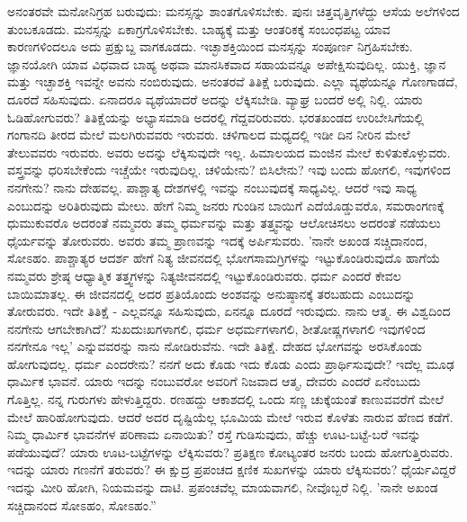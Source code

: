 ಅನಂತರವೇ ಮನೋನಿಗ್ರಹ ಬರುವುದು: ಮನಸ್ಸನ್ನು ಶಾಂತಗೊಳಿಸಬೇಕು. ಪುನಃ ಚಿತ್ತವೃತ್ತಿಗಳೆದ್ದು ಆಸೆಯ ಅಲೆಗಳಿಂದ ತುಂಬಕೂಡದು. ಮನಸ್ಸನ್ನು ಏಕಾಗ್ರಗೊಳಿಸಬೇಕು. ಬಾಹ್ಯಕ್ಕೆ ಮತ್ತು ಆಂತರಿಕಕ್ಕೆ ಸಂಬಂಧಪಟ್ಟ ಯಾವ ಕಾರಣಗಳಿಂದಲೂ ಅದು ಪ್ರಕ್ಷುಬ್ದ ವಾಗಕೂಡದು. ಇಚ್ಛಾಶಕ್ತಿಯಿಂದ ಮನಸ್ಸನ್ನು ಸಂಪೂರ್ಣ ನಿಗ್ರಹಿಸಬೇಕು. ಜ್ಞಾನಯೋಗಿ ಯಾವ ವಿಧವಾದ ಬಾಹ್ಯ ಅಥವಾ ಮಾನಸಿಕವಾದ ಸಹಾಯವನ್ನೂ ಅಪೇಕ್ಷಿಸುವುದಿಲ್ಲ. ಯುಕ್ತಿ, ಜ್ಞಾನ ಮತ್ತು ಇಚ್ಛಾಶಕ್ತಿ ಇವನ್ನೇ ಅವನು ನಂಬಿರುವುದು. ಅನಂತರವೆ ತಿತಿಕ್ಷೆ ಬರುವುದು. ಎಲ್ಲಾ ವ್ಯಥೆಯನ್ನೂ ಗೊಣಗಾಡದೆ, ದೂರದೆ ಸಹಿಸುವುದು. ಏನಾದರೂ ವ್ಯಥೆಯಾದರೆ ಅದನ್ನು ಲೆಕ್ಕಿಸಬೇಡಿ. ವ್ಯಾಘ್ರ ಬಂದರೆ ಅಲ್ಲಿ ನಿಲ್ಲಿ. ಯಾರು ಓಡಿಹೋಗುವರು? ತಿತಿಕ್ಷೆಯನ್ನು ಅಭ್ಯಾಸಮಾಡಿ ಅದರಲ್ಲಿ ಗೆದ್ದವರಿರುವರು. ಭರತಖಂಡದ ಉರಿಬೇಸಿಗೆಯಲ್ಲಿ ಗಂಗಾನದಿ ತೀರದ ಮೇಲೆ ಮಲಗಿರುವವರು ಇರುವರು. ಚಳಿಗಾಲದ ಮಧ್ಯದಲ್ಲಿ ಇಡೀ ದಿನ ನೀರಿನ ಮೇಲೆ ತೇಲುವವರು ಇರುವರು. ಅವರು ಅದನ್ನು ಲೆಕ್ಕಿಸುವುದೇ ಇಲ್ಲ. ಹಿಮಾಲಯದ ಮಂಜಿನ ಮೇಲೆ ಕುಳಿತುಕೊಳ್ಳುವರು. ವಸ್ತ್ರವನ್ನು ಧರಿಸಬೇಕೆಂದು ಇಚ್ಚೆಯೇ ಇರುವುದಿಲ್ಲ. ಚಳಿಯೇನು? ಬಿಸಿಲೇನು? ಇವು ಬಂದು ಹೋಗಲಿ, ಇವುಗಳಿಂದ ನನಗೇನು? ನಾನು ದೇಹವಲ್ಲ. ಪಾಶ್ಚಾತ್ಯ ದೇಶಗಳಲ್ಲಿ ಇವನ್ನು ನಂಬುವುದಕ್ಕೆ ಸಾಧ್ಯವಿಲ್ಲ. ಆದರೆ ಇವು ಸಾಧ್ಯ ಎಂಬುದನ್ನು ಅರಿತಿರುವುದು ಮೇಲು. ಹೇಗೆ ನಿಮ್ಮ ಜನರು ಗುಂಡಿನ ಬಾಯಿಗೆ ಎದೆಯೊಡ್ಡುವರೊ, ಸಮರಾಂಗಣಕ್ಕೆ ಧುಮುಕುವರೊ ಅದರಂತೆ ನಮ್ಮವರು ತಮ್ಮ ಧರ್ಮವನ್ನು ಮತ್ತು ತತ್ತ್ವವನ್ನು ಆಲೋಚಿಸಲು ಅದರಂತೆ ನಡೆಯಲು ಧೈರ್ಯವನ್ನು ತೋರುವರು. ಅವರು ತಮ್ಮ ಪ್ರಾಣವನ್ನು ಇದಕ್ಕೆ ಅರ್ಪಿಸುವರು. 'ನಾನೇ ಅಖಂಡ ಸಚ್ಚಿದಾನಂದ, ಸೋಽಹಂ. ಪಾಶ್ಚಾತ್ಯರ ಆದರ್ಶ ಹೇಗೆ ನಿತ್ಯ ಜೀವನದಲ್ಲಿ ಭೋಗಸಾಮಗ್ರಿಗಳನ್ನು ಇಟ್ಟುಕೊಂಡಿರುವುದೊ ಹಾಗೆಯೆ ನಮ್ಮವರು ಶ್ರೇಷ್ಠ ಆಧ್ಯಾತ್ಮಿಕ ತತ್ತ್ವಗಳನ್ನು ನಿತ್ಯಜೀವನದಲ್ಲಿ ಇಟ್ಟುಕೊಂಡಿರುವರು. ಧರ್ಮ ಎಂದರೆ ಕೇವಲ ಬಾಯಿಮಾತಲ್ಲ. ಈ ಜೀವನದಲ್ಲಿ ಅದರ ಪ್ರತಿಯೊಂದು ಅಂಶವನ್ನು ಅನುಷ್ಠಾನಕ್ಕೆ ತರಬಹುದು ಎಂಬುದನ್ನು ತೋರುವರು. ಇದೇ ತಿತಿಕ್ಷೆ - ಎಲ್ಲವನ್ನೂ ಸಹಿಸುವುದು, ಏನನ್ನೂ ದೂರದೆ ಇರುವುದು. ನಾನು ಆತ್ಮ. ಈ ವಿಶ್ವದಿಂದ ನನಗೇನು ಆಗಬೇಕಾಗಿದೆ? ಸುಖದುಃಖಗಳಾಗಲಿ, ಧರ್ಮ ಅಧರ್ಮಗಳಾಗಲಿ, ಶೀತೋಷ್ಣಗಳಾಗಲಿ ಇವುಗಳಿಂದ ನನಗೇನೂ ಇಲ್ಲ' ಎನ್ನುವವರನ್ನು ನಾನು ನೋಡಿರುವೆನು. ಇದೇ ತಿತಿಕ್ಷೆ. ದೇಹದ ಭೋಗವನ್ನು ಅರಸಿಕೊಂಡು ಹೋಗುವುದಲ್ಲ. ಧರ್ಮ ಎಂದರೇನು? ನನಗೆ ಅದು ಕೊಡು ಇದು ಕೊಡು ಎಂದು ಪ್ರಾರ್ಥಿಸುವುದೇ? ಇದೆಲ್ಲ ಮೂಢ ಧಾರ್ಮಿಕ ಭಾವನೆ. ಯಾರು ಇದನ್ನು ನಂಬುವರೋ ಅವರಿಗೆ ನಿಜವಾದ ಆತ್ಮ, ದೇವರು ಎಂದರೆ ಏನೆಂಬುದು ಗೊತ್ತಿಲ್ಲ. ನನ್ನ ಗುರುಗಳು ಹೇಳುತ್ತಿದ್ದರು. ರಣಹದ್ದು ಆಕಾಶದಲ್ಲಿ ಒಂದು ಸಣ್ಣ ಚುಕ್ಕೆಯಂತೆ ಕಾಣುವವರೆಗೆ ಮೇಲೆ ಮೇಲೆ ಹಾರಿಹೋಗುವುದು. ಆದರೆ ಅದರ ದೃಷ್ಟಿಯೆಲ್ಲ ಭೂಮಿಯ ಮೇಲೆ ಇರುವ ಕೊಳೆತು ನಾರುವ ಹೆಣದ ಕಡೆಗೆ. ನಿಮ್ಮ ಧಾರ್ಮಿಕ ಭಾವನೆಗಳ ಪರಿಣಾಮ ಏನಾಯಿತು? ರಸ್ತೆ ಗುಡಿಸುವುದು, ಹೆಚ್ಚು ಊಟ-ಬಟ್ಟೆ-ಬರೆ ಇವನ್ನು ಪಡೆಯುವುದೆ? ಯಾರು ಊಟ-ಬಟ್ಟೆಗಳನ್ನು ಲೆಕ್ಕಿಸುವರು? ಪ್ರತಿಕ್ಷಣ ಕೋಟ್ಯಂತರ ಜನರು ಬಂದು ಹೋಗುತ್ತಿರುವರು. ಇದನ್ನು ಯಾರು ಗಣನೆಗೆ ತರುವರು? ಈ ಕ್ಷುದ್ರ ಪ್ರಪಂಚದ ಕ್ಷಣಿಕ ಸುಖಗಳನ್ನು ಯಾರು ಲೆಕ್ಕಿಸುವರು? ಧೈರ್ಯವಿದ್ದರೆ ಇದನ್ನು ಮೀರಿ ಹೋಗಿ, ನಿಯಮವನ್ನು ದಾಟಿ. ಪ್ರಪಂಚವೆಲ್ಲ ಮಾಯವಾಗಲಿ, ನೀವೊಬ್ಬರೆ ನಿಲ್ಲಿ. 'ನಾನೇ ಅಖಂಡ ಸಚ್ಚಿದಾನಂದ ಸೋಽಹಂ, ಸೋಽಹಂ.”

